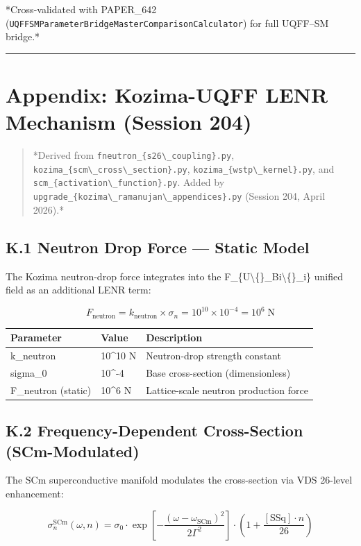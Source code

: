 \documentclass[11pt]{article}
\begin{document}
*Cross-validated with PAPER\_642 (\verb|UQFFSMParameterBridgeMasterComparisonCalculator|) for full UQFF--SM bridge.*

\noindent\rule{\textwidth}{0.4pt}

\section*{Appendix: Kozima-UQFF LENR Mechanism (Session 204)}

\begin{quote}
*Derived from \verb|fneutron_{s26\_coupling}.py|, \verb|kozima_{scm\_cross\_section}.py|,
\verb|kozima_{wstp\_kernel}.py|, and \verb|scm_{activation\_function}.py|. Added by
\verb|upgrade_{kozima\_ramanujan\_appendices}.py| (Session 204, April 2026).*
\end{quote}

\subsection*{K.1 Neutron Drop Force --- Static Model}

The Kozima neutron-drop force integrates into the F\_\{U\textbackslash\{\}\_Bi\textbackslash\{\}\_i\} unified field as an additional LENR term:

$$F_{\mathrm{neutron}} = k_{\mathrm{neutron}} \times \sigma_n = 10^{10} \times 10^{-4} = 10^6 \;\text{N}$$

\begin{center}
\begin{longtable}{lll}
\toprule
Parameter & Value & Description \tabularnewline
\midrule
\endhead
k\_neutron & 10\textasciicircum{}10 N & Neutron-drop strength constant \tabularnewline
sigma\_0 & 10\textasciicircum{}-4 & Base cross-section (dimensionless) \tabularnewline
F\_neutron (static) & 10\textasciicircum{}6 N & Lattice-scale neutron production force \tabularnewline
\bottomrule
\end{longtable}
\end{center}

\subsection*{K.2 Frequency-Dependent Cross-Section (SCm-Modulated)}

The SCm superconductive manifold modulates the cross-section via VDS 26-level enhancement:

$$\sigma_n^{\mathrm{SCm}}(\omega, n) = \sigma_0 \cdot \exp\!\left[-\frac{(\omega - \omega_{\mathrm{SCm}})^2}{2\Gamma^2}\right] \cdot \left(1 + \frac{[\text{SSq}] \cdot n}{26}\right)$$
\end{document}
